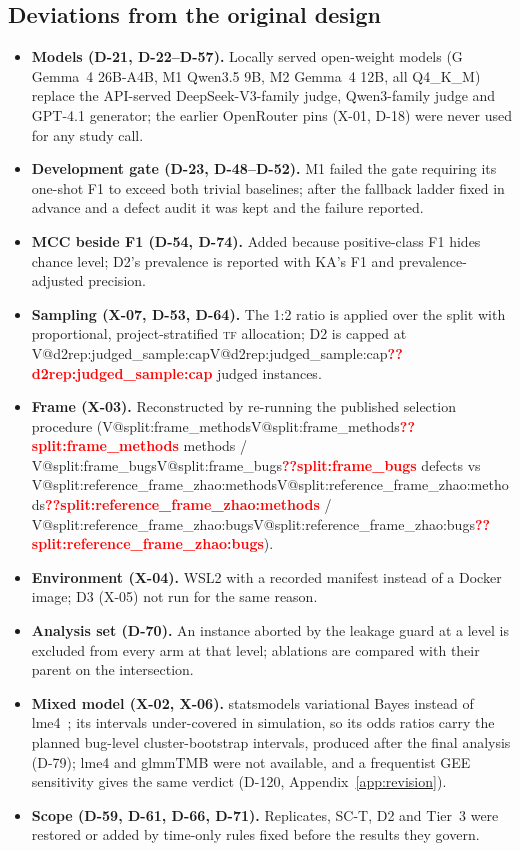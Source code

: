\documentclass[pdflatex,iicol,sn-mathphys-num]{sn-jnl}
\makeatletter
\newcommand{\V}[1]{\ifcsname V@#1\endcsname\csname V@#1\endcsname\else\textbf{\textcolor{red}{??#1}}\fi}
\newcommand{\TF}{\textsc{tf}}
\makeatother
\begin{document}
\begin{appendices}
\section{Deviations from the original design}\label{app:deviations}
\footnotesize
\begin{itemize}
\item \textbf{Models (D-21, D-22--D-57).} Locally served open-weight models (G Gemma~4 26B-A4B, M1 Qwen3.5 9B, M2 Gemma~4 12B, all Q4\_K\_M) replace the API-served DeepSeek-V3-family judge, Qwen3-family judge and GPT-4.1 generator; the earlier OpenRouter pins (X-01, D-18) were never used for any study call.
\item \textbf{Development gate (D-23, D-48--D-52).} M1 failed the gate requiring its one-shot F1 to exceed both trivial baselines; after the fallback ladder fixed in advance and a defect audit it was kept and the failure reported.
\item \textbf{MCC beside F1 (D-54, D-74).} Added because positive-class F1 hides chance level; D2's prevalence is reported with KA's F1 and prevalence-adjusted precision.
\item \textbf{Sampling (X-07, D-53, D-64).} The 1:2 ratio is applied over the split with proportional, project-stratified \TF{} allocation; D2 is capped at \V{d2rep:judged_sample:cap} judged instances.
\item \textbf{Frame (X-03).} Reconstructed by re-running the published selection procedure (\V{split:frame_methods} methods / \V{split:frame_bugs} defects vs \V{split:reference_frame_zhao:methods} / \V{split:reference_frame_zhao:bugs}).
\item \textbf{Environment (X-04).} WSL2 with a recorded manifest instead of a Docker image; D3 (X-05) not run for the same reason.
\item \textbf{Analysis set (D-70).} An instance aborted by the leakage guard at a level is excluded from every arm at that level; ablations are compared with their parent on the intersection.
\item \textbf{Mixed model (X-02, X-06).} statsmodels variational Bayes instead of lme4~\cite{bates2015lme4,seabold2010statsmodels}; its intervals under-covered in simulation, so its odds ratios carry the planned bug-level cluster-bootstrap intervals, produced after the final analysis (D-79); lme4 and glmmTMB were not available, and a frequentist GEE sensitivity gives the same verdict (D-120, Appendix~\ref{app:revision}).
\item \textbf{Scope (D-59, D-61, D-66, D-71).} Replicates, SC-T, D2 and Tier~3 were restored or added by time-only rules fixed before the results they govern.

\end{itemize}
\end{appendices}
\end{document}
